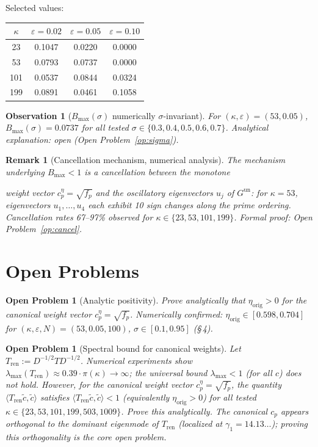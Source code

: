 \documentclass[11pt]{article}
\newtheorem{observation}[theorem]{Observation}
\newtheorem*{remark}{Remark}
\newtheorem{openproblem}[theorem]{Open Problem}
\newcommand{\etaorig}{\eta_{\mathrm{orig}}}
\newcommand{\Tren}{T_{\mathrm{ren}}}
\newcommand{\Gun}{G^{\mathrm{un}}}
\newcommand{\ceta}{c_p^{\eta}}
\newcommand{\fp}{f_p}
\begin{document}
Selected values:

\begin{center}
\begin{tabular}{cccc}
\toprule
$\kappa$ & $\varepsilon=0.02$ & $\varepsilon=0.05$ & $\varepsilon=0.10$ \\
\midrule
23  & 0.1047 & 0.0220 & 0.0000 \\
53  & 0.0793 & 0.0737 & 0.0000 \\
101 & 0.0537 & 0.0844 & 0.0324 \\
199 & 0.0891 & 0.0461 & 0.1058 \\
\bottomrule
\end{tabular}
\end{center}

\begin{observation}[$B_{\max}(\sigma)$ numerically $\sigma$-invariant]
For $(\kappa,\varepsilon)=(53,0.05)$, $B_{\max}(\sigma)=0.0737$ for all
tested $\sigma\in\{0.3,0.4,0.5,0.6,0.7\}$. Analytical explanation: open
(Open Problem~\ref{op:sigma}).
\end{observation}

\begin{remark}[Cancellation mechanism, numerical analysis]
The mechanism underlying $B_{\max}<1$ is a cancellation between the monotone

weight vector $\ceta=\sqrt{\fp}$ and the oscillatory eigenvectors $u_j$
of $\Gun$: for $\kappa=53$, eigenvectors $u_1,\ldots,u_4$ each exhibit 10
sign changes along the prime ordering. Cancellation rates 67--97\% observed
for $\kappa\in\{23,53,101,199\}$. Formal proof: Open Problem~\ref{op:cancel}.
\end{remark}

\section{Open Problems}


\begin{openproblem}[Analytic positivity]\label{op:pos}
Prove analytically that $\etaorig>0$ for the canonical weight vector
$\ceta=\sqrt{\fp}$.
Numerically confirmed: $\etaorig\in[0.598,0.704]$ for $(\kappa,\varepsilon,N)=(53,0.05,100)$,
$\sigma\in[0.1,0.95]$ (\S\,4).
\end{openproblem}

\begin{openproblem}[Spectral bound for canonical weights]\label{op:spectral}
Let $\Tren:=D^{-1/2}TD^{-1/2}$.
Numerical experiments show $\lambda_{\max}(\Tren)\approx 0.39\cdot\pi(\kappa)\to\infty$;
the universal bound $\lambda_{\max}<1$ (for all $c$) does not hold.
However, for the canonical weight vector $\ceta=\sqrt{\fp}$,
the quantity $\langle\Tren\tilde{c},\tilde{c}\rangle$ satisfies
$\langle\Tren\tilde{c},\tilde{c}\rangle<1$ (equivalently $\etaorig>0$)
for all tested $\kappa\in\{23,53,101,199,503,1009\}$.
Prove this analytically. The canonical $c_p$ appears orthogonal to the
dominant eigenmode of $\Tren$ (localized at $\gamma_1=14.13\ldots$);
proving this orthogonality is the core open problem.
\end{openproblem}
\end{document}
